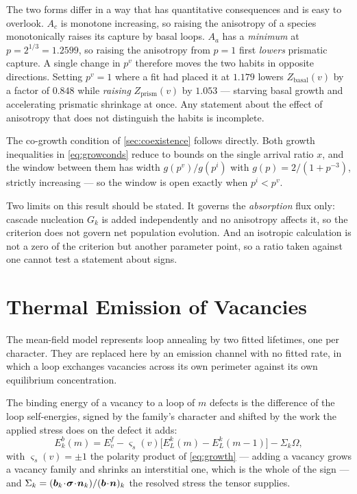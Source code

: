 The two forms differ in a way that has quantitative consequences and is easy to
overlook. $A_c$ is monotone increasing, so raising the anisotropy of a species
monotonically raises its capture by basal loops. $A_a$ has a \emph{minimum} at
$p=2^{1/3}=1.2599$, so raising the anisotropy from $p=1$ first \emph{lowers}
prismatic capture. A single change in $p^{v}$ therefore moves the two habits in
opposite directions. Setting $p^{v}=1$ where a fit had placed it at $1.179$
lowers $Z_{\mathrm{basal}}(v)$ by a factor of $0.848$ while \emph{raising}
$Z_{\mathrm{prism}}(v)$ by $1.053$ --- starving basal growth and accelerating
prismatic shrinkage at once. Any statement about the effect of anisotropy that
does not distinguish the habits is incomplete.

The co-growth condition of \cref{sec:coexistence} follows directly. Both growth
inequalities in \cref{eq:growconds} reduce to bounds on the single arrival ratio
$x$, and the window between them has width $g(p^{v})/g(p^{i})$ with
$g(p)=2/(1+p^{-3})$, strictly increasing --- so the window is open exactly when
$p^{i}<p^{v}$.

Two limits on this result should be stated. It governs the \emph{absorption}
flux only: cascade nucleation $G_k$ is added independently and no anisotropy
affects it, so the criterion does not govern net population evolution. And an
isotropic calculation is not a zero of the criterion but another parameter
point, so a ratio taken against one cannot test a statement about signs.

\section{Thermal Emission of Vacancies}
\label{app:emission}

The mean-field model represents loop annealing by two fitted lifetimes, one per
character. They are replaced here by an emission channel with no fitted rate, in
which a loop exchanges vacancies across its own perimeter against its own
equilibrium concentration.

The binding energy of a vacancy to a loop of $m$ defects is the difference of
the loop self-energies, signed by the family's character and shifted by the work
the applied stress does on the defect it adds:
\begin{equation}
  E^{b}_k(m)=E^{f}_v
    -\varsigma_s(v)\bigl[E_L^{k}(m)-E_L^{k}(m-1)\bigr]
    -\Sigma_k\Omega ,
  \label{eq:Eb}
\end{equation}
with $\varsigma_s(v)=\pm1$ the polarity product of \cref{eq:growth} --- adding a
vacancy grows a vacancy family and shrinks an interstitial one, which is the
whole of the sign --- and $\Sigma_k=(\bm{b}_k\!\cdot\!\bm\sigma\!\cdot\!\bm{n}_k)/
(\bm{b}\!\cdot\!\bm{n})_k$ the resolved stress the tensor supplies.

